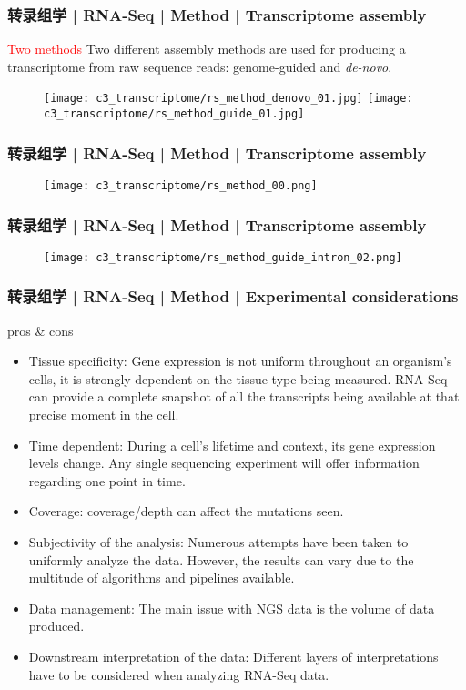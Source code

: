 \begin{frame}
  \frametitle{转录组学 | RNA-Seq | Method | Transcriptome assembly}
  \begin{block}{\textcolor{red}{Two methods}}
    Two different assembly methods are used for producing a transcriptome from raw sequence reads: genome-guided and \textit{de-novo}. 
  \end{block}
  \begin{figure}
    \centering
    \texttt{[image: c3\_transcriptome/rs\_method\_denovo\_01.jpg]} \quad
    \texttt{[image: c3\_transcriptome/rs\_method\_guide\_01.jpg]}
  \end{figure}
\end{frame}

\begin{frame}
  \frametitle{转录组学 | RNA-Seq | Method | Transcriptome assembly}
  \begin{figure}
    \centering
    \texttt{[image: c3\_transcriptome/rs\_method\_00.png]}
  \end{figure}
\end{frame}

\begin{frame}
  \frametitle{转录组学 | RNA-Seq | Method | Transcriptome assembly}
  \begin{figure}
    \centering
    \texttt{[image: c3\_transcriptome/rs\_method\_guide\_intron\_02.png]}
  \end{figure}
\end{frame}

\begin{frame}
  \frametitle{转录组学 | RNA-Seq | Method | Experimental considerations}
  {\footnotesize
  \begin{block}{pros \& cons}
    \begin{itemize}
      \item Tissue specificity: Gene expression is not uniform throughout an organism's cells, it is strongly dependent on the tissue type being measured. RNA-Seq can provide a complete snapshot of all the transcripts being available at that precise moment in the cell.
      \item Time dependent: During a cell's lifetime and context, its gene expression levels change. Any single sequencing experiment will offer information regarding one point in time.
      \item Coverage: coverage/depth can affect the mutations seen.
      \item Subjectivity of the analysis: Numerous attempts have been taken to uniformly analyze the data. However, the results can vary due to the multitude of algorithms and pipelines available.
      \item Data management: The main issue with NGS data is the volume of data produced.
      \item Downstream interpretation of the data: Different layers of interpretations have to be considered when analyzing RNA-Seq data.
    \end{itemize}
  \end{block}
  }
\end{frame}

